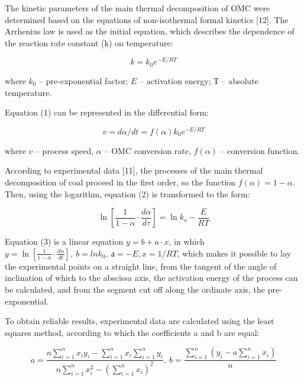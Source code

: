 \begin{multicols}{2}
The kinetic parameters of the main thermal decomposition of OMC were
determined based on the equations of non-isothermal formal kinetics
{[}12{]}. The Arrhenius law is used as the initial equation, which
describes the dependence of the reaction rate constant (k) on
temperature:

\begin{equation}
k = k_{0}e^{- E/RT}
\end{equation}

where $k_{0}$ -- pre-exponential factor; $E$ --
activation energy; $Т$ -- absolute temperature.

Equation (1) can be represented in the differential form:

\begin{equation}
v= d\alpha/dt = f(\alpha)k_{0}e^{- E/RT}
\end{equation}

where $v$ -- process speed, $α$ -- OMC conversion rate, $f (α)$ -- conversion
function.

According to experimental data {[}11{]}, the processes of the main
thermal decomposition of coal proceed in the first order, so the
function $f (α) = 1 - α$. Then, using the logarithm, equation (2) is
transformed to the form:

\begin{equation}
\ln \left[ \frac{1}{1 - \alpha} \cdot \frac{d\alpha}{d\tau} \right] = \ln k_{o} - \frac{E}{RT}
\end{equation}

Equation (3) is a linear equation $y=b+a\cdot x$,
in which \(y = \ln \left[ \frac{1}{1 - \alpha} \cdot \frac{d\alpha}{dt} \right],\ b = lnk_{0},\ а
= -E, x = 1/RT\), which makes it possible to lay the experimental points
on a straight line, from the tangent of the angle of inclination of
which to the abscissa axis, the activation energy of the process can be
calculated, and from the segment cut off along the ordinate axis, the
pre-exponential.

To obtain reliable results, experimental data are calculated using the
least squares method, according to which the coefficients a and b are
equal:
\end{multicols}

\begin{equation}
a = \frac{n \sum_{i=1}^{n} x_{i} y_{i} - \sum_{i=1}^{n} x_{i} \sum_{i=1}^{n} y_{i}}{n \sum_{i=1}^{n} x_{i}^{2} - \left( \sum_{i=1}^{n} x_{i} \right)^{2}},\
b = \frac{\sum_{i=1}^{n} \left( y_{i} - a \sum_{i=1}^{n} x_{i} \right)}{n}
\end{equation}


